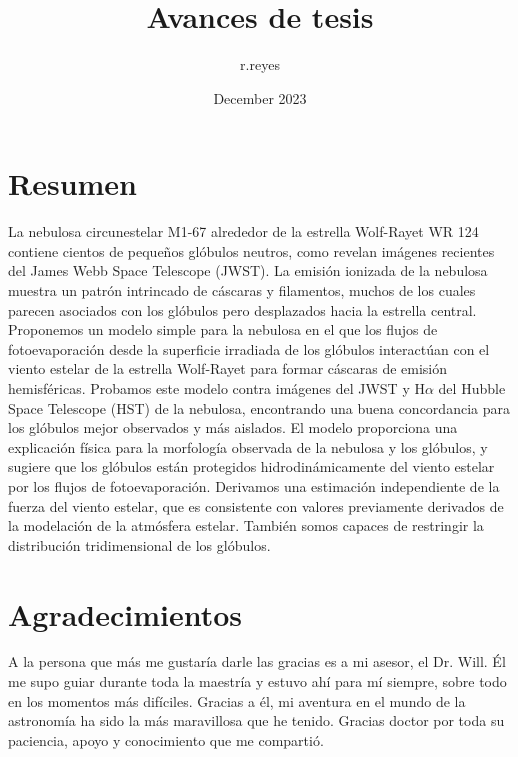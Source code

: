 \documentclass{book}
\title{Avances de tesis}
\author{r.reyes }
\date{December 2023}
\begin{document}
\begin{titlepage}

\end{titlepage}


\chapter*{Resumen}

La nebulosa circunestelar M1-67 alrededor de la estrella Wolf-Rayet WR 124 contiene cientos de pequeños glóbulos neutros, como revelan imágenes recientes del  James Webb Space Telescope (JWST). La emisión ionizada de la nebulosa muestra un patrón intrincado de cáscaras y filamentos, muchos de los cuales parecen asociados con los glóbulos pero desplazados hacia la estrella central. Proponemos un modelo simple para la nebulosa en el que los flujos de fotoevaporación desde la superficie irradiada de los glóbulos interactúan con el viento estelar de la estrella Wolf-Rayet para formar cáscaras de emisión hemisféricas. Probamos este modelo contra imágenes del JWST y H$\alpha$ del Hubble Space Telescope (HST) de la nebulosa, encontrando una buena concordancia para los glóbulos mejor observados y más aislados. El modelo proporciona una explicación física para la morfología observada de la nebulosa y los glóbulos, y sugiere que los glóbulos están protegidos hidrodinámicamente del viento estelar por los flujos de fotoevaporación. Derivamos una estimación independiente de la fuerza del viento estelar, que es consistente con valores previamente derivados de la modelación de la atmósfera estelar. También somos capaces de restringir la distribución tridimensional de los glóbulos.

\chapter*{Agradecimientos}

A la persona que más me gustaría darle las gracias es a mi asesor, el Dr. Will. Él me supo guiar durante toda la maestría y estuvo ahí para mí siempre, sobre todo en los momentos más difíciles. Gracias a él, mi aventura en el mundo de la astronomía ha sido la más maravillosa que he tenido. Gracias doctor por toda su paciencia, apoyo y conocimiento que me compartió.
\end{document}
